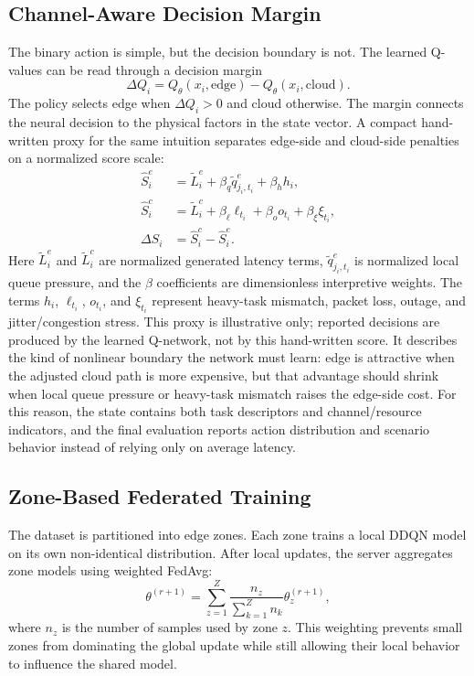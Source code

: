 \subsection{Channel-Aware Decision Margin}

The binary action is simple, but the decision boundary is not. The learned Q-values can be read through a decision margin
\begin{equation}
\Delta Q_i = Q_{\theta}(x_i,\mathrm{edge}) - Q_{\theta}(x_i,\mathrm{cloud}).
\label{eq:q_margin}
\end{equation}
The policy selects edge when $\Delta Q_i>0$ and cloud otherwise. The margin connects the neural decision to the physical factors in the state vector. A compact hand-written proxy for the same intuition separates edge-side and cloud-side penalties on a normalized score scale:
\begin{align}
\widehat{S}_i^e &=
\tilde{L}_i^e+\beta_q\tilde{q}^e_{j_i,t_i}+\beta_h h_i, \\
\widehat{S}_i^c &=
\tilde{L}_i^c+\beta_\ell \ell_{t_i}+\beta_o o_{t_i}+\beta_\xi \xi_{t_i}, \\
\Delta S_i &= \widehat{S}_i^c-\widehat{S}_i^e.
\label{eq:latency_margin}
\end{align}
Here $\tilde{L}_i^e$ and $\tilde{L}_i^c$ are normalized generated latency terms, $\tilde{q}^e_{j_i,t_i}$ is normalized local queue pressure, and the $\beta$ coefficients are dimensionless interpretive weights. The terms $h_i$, $\ell_{t_i}$, $o_{t_i}$, and $\xi_{t_i}$ represent heavy-task mismatch, packet loss, outage, and jitter/congestion stress. This proxy is illustrative only; reported decisions are produced by the learned Q-network, not by this hand-written score. It describes the kind of nonlinear boundary the network must learn: edge is attractive when the adjusted cloud path is more expensive, but that advantage should shrink when local queue pressure or heavy-task mismatch raises the edge-side cost. For this reason, the state contains both task descriptors and channel/resource indicators, and the final evaluation reports action distribution and scenario behavior instead of relying only on average latency.

\subsection{Zone-Based Federated Training}

The dataset is partitioned into edge zones. Each zone trains a local DDQN model on its own non-identical distribution. After local updates, the server aggregates zone models using weighted FedAvg:
\begin{equation}
\theta^{(r+1)}=\sum_{z=1}^{Z}\frac{n_z}{\sum_{k=1}^{Z}n_k}\theta_z^{(r+1)},
\label{eq:fedavg_main}
\end{equation}
where $n_z$ is the number of samples used by zone $z$. This weighting prevents small zones from dominating the global update while still allowing their local behavior to influence the shared model.

